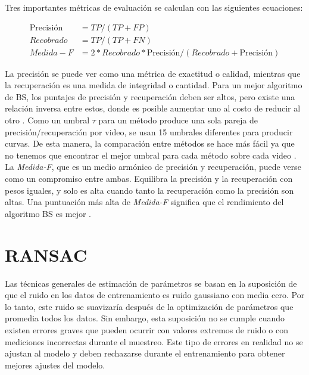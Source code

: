 Tres importantes métricas de evaluación se calculan con las siguientes ecuaciones:

\begin{equation*}
    \begin{split}
        \text{Precisión} & = TP/(TP + FP)\\
        Recobrado & = TP/(TP + FN)\\
        Medida-F & =  2 * Recobrado * \text{Precisión}/(Recobrado + \text{Precisión})
    \end{split}
\end{equation*}

La precisión se puede ver como una métrica de exactitud o calidad, mientras que la recuperación es una medida de integridad o cantidad. Para un mejor algoritmo de BS, los puntajes de precisión y recuperación deben ser altos, pero existe una relación inversa entre estos, donde es posible aumentar uno al costo de reducir al otro \cite{GuangleTaoJiandanPingWenwu}. Como un umbral $\tau$ para un método produce una sola pareja de precisión/recuperación por video, se usan 15 umbrales diferentes para producir curvas. De esta manera, la comparación entre métodos se hace más fácil ya que no tenemos que encontrar el mejor umbral para cada método sobre cada video \cite{YannickPierreMarcBrunoHeleneChristophe}. La \textit{Medida-F}, que es un medio armónico de precisión y recuperación, puede verse como un compromiso entre ambas. Equilibra la precisión y la recuperación con pesos iguales, y solo es alta cuando tanto la recuperación como la precisión son altas. Una puntuación más alta de \textit{Medida-F} significa que el rendimiento del algoritmo BS es mejor \cite{GuangleTaoJiandanPingWenwu}.

\section{RANSAC} \label{sec:RANSAC}

Las técnicas generales de estimación de parámetros se basan en la suposición de que el ruido en los datos de entrenamiento es ruido gaussiano con media cero. Por lo tanto, este ruido se suavizaría después de la optimización de parámetros que promedia todos los datos. Sin embargo, esta suposición no se cumple cuando existen errores graves que pueden ocurrir con valores extremos de ruido o con mediciones incorrectas durante el muestreo. Este tipo de errores en realidad no se ajustan al modelo y deben rechazarse durante el entrenamiento para obtener mejores ajustes del modelo.

